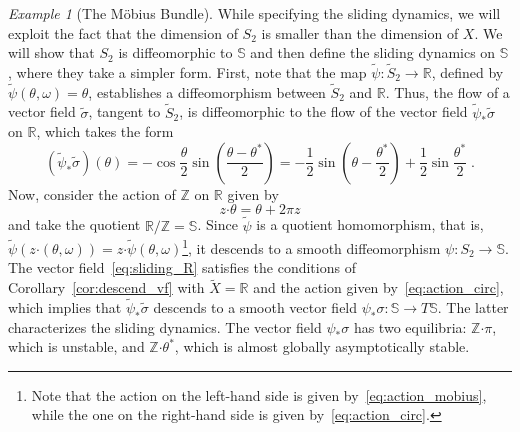 \documentclass{article}
\theoremstyle{definition}
\theoremstyle{remark}
\newtheorem{example}{Example}
\newcommand{\bscdot}{\boldsymbol{\cdot}}
\newcommand{\DI}{\tilde{X}}	%
\newcommand{\IN}{\mathbb{Z}}	%
\newcommand{\MA}{X}	%
\newcommand{\RR}{\mathbb{R}}	%
\newcommand{\SP}{\mathbb{S}}	%
\newcommand{\SW}{S}	%
\newcommand{\SWR}{\tilde{S}}	%
\begin{document}
\begin{example}[The M\"obius Bundle]
 While specifying the sliding dynamics, we will exploit the fact that the dimension of $\SW_2$ is smaller
 than the dimension of $\MA$. We will show that $\SW_2$ is diffeomorphic to $\SP$ and then define the sliding dynamics on
 $\SP$, where they take a simpler form. First, note that the map $\tilde{\psi}:\SWR_2 \to \RR$, defined by 
 $\tilde{\psi}(\theta,\omega) = \theta$, establishes a diffeomorphism between $\SWR_2$ and $\RR$.
 Thus, the flow of a vector field $\tilde{\sigma}$, tangent to $\SWR_2$, is diffeomorphic
 to the flow of the vector field $\tilde{\psi}_*\tilde{\sigma}$ on $\RR$, which takes the form
 \begin{equation} \label{eq:sliding_R}
  (\tilde{\psi}_* \tilde{\sigma})(\theta) = -\cos\frac{\theta}{2}\sin\left(\frac{\theta - \theta^*}{2}\right) = 
   -\frac{1}{2}\sin\left( \theta - \frac{\theta^*}{2} \right) + \frac{1}{2}\sin \frac{\theta^*}{2} \;.
 \end{equation}
 Now, consider the action of $\IN$ on $\RR$ given by
 \begin{equation} \label{eq:action_circ}
  z\bscdot \theta = \theta + 2\pi z
 \end{equation}
 and take the quotient $\RR/\IN = \SP$. Since $\tilde{\psi}$ is a quotient homomorphism, 
 that is, $\tilde{\psi}(z\bscdot (\theta,\omega)) = z \bscdot \tilde{\psi}(\theta,\omega)$\footnote{Note
 that the action on the left-hand side is given by~\eqref{eq:action_mobius}, while the one on the
 right-hand side is given by~\eqref{eq:action_circ}.}, it descends to a smooth
 diffeomorphism $\psi : \SW_2 \to \SP$. The vector field~\eqref{eq:sliding_R} satisfies the
 conditions of Corollary~\ref{cor:descend_vf} with $\DI = \RR$ and the action given 
 by~\eqref{eq:action_circ}, which implies that $\tilde{\psi}_*\tilde{\sigma}$ descends to a smooth
 vector field $\psi_* \sigma : \SP \to T\SP$. The latter characterizes the sliding dynamics.
 The vector field $\psi_* \sigma$ has two equilibria: $\IN\bscdot\pi$, which is unstable,
 and $\IN \bscdot \theta^*$, which is almost globally asymptotically stable.
 

\end{example}
\end{document}
